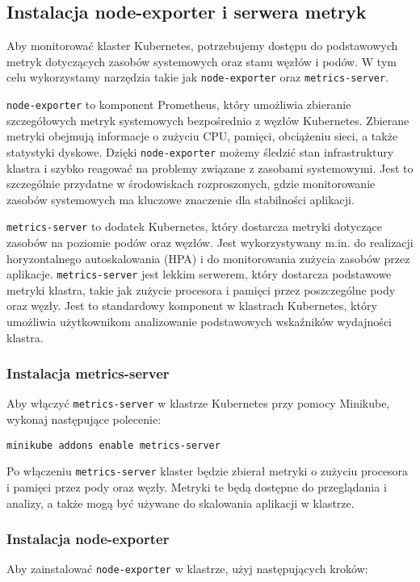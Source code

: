 \documentclass{article}
\begin{document}
\subsection{Instalacja node-exporter i serwera metryk}

Aby monitorować klaster Kubernetes, potrzebujemy dostępu do podstawowych metryk dotyczących zasobów systemowych oraz stanu węzłów i podów. W tym celu wykorzystamy narzędzia takie jak \texttt{node-exporter} oraz \texttt{metrics-server}.

\texttt{node-exporter} to komponent Prometheus, który umożliwia zbieranie szczegółowych metryk systemowych bezpośrednio z węzłów Kubernetes. Zbierane metryki obejmują informacje o zużyciu CPU, pamięci, obciążeniu sieci, a także statystyki dyskowe. Dzięki \texttt{node-exporter} możemy śledzić stan infrastruktury klastra i szybko reagować na problemy związane z zasobami systemowymi. Jest to szczególnie przydatne w środowiskach rozproszonych, gdzie monitorowanie zasobów systemowych ma kluczowe znaczenie dla stabilności aplikacji.

\texttt{metrics-server} to dodatek Kubernetes, który dostarcza metryki dotyczące zasobów na poziomie podów oraz węzłów. Jest wykorzystywany m.in. do realizacji horyzontalnego autoskalowania (HPA) i do monitorowania zużycia zasobów przez aplikacje. \texttt{metrics-server} jest lekkim serwerem, który dostarcza podstawowe metryki klastra, takie jak zużycie procesora i pamięci przez poszczególne pody oraz węzły. Jest to standardowy komponent w klastrach Kubernetes, który umożliwia użytkownikom analizowanie podstawowych wskaźników wydajności klastra.

\subsubsection{Instalacja metrics-server}
Aby włączyć \texttt{metrics-server} w klastrze Kubernetes przy pomocy Minikube, wykonaj następujące polecenie:

\begin{lstlisting}
minikube addons enable metrics-server
\end{lstlisting}

Po włączeniu \texttt{metrics-server} klaster będzie zbierał metryki o zużyciu procesora i pamięci przez pody oraz węzły. Metryki te będą dostępne do przeglądania i analizy, a także mogą być używane do skalowania aplikacji w klastrze.

\subsubsection{Instalacja node-exporter}
Aby zainstalować \texttt{node-exporter} w klastrze, użyj następujących kroków:
\end{document}
